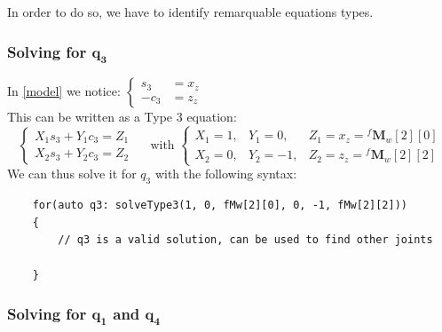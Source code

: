 \documentclass{ecnreport}
\begin{document}
In order to do so, we have to identify remarquable equations types. 

\subsubsection*{Solving for $\mathbf{q_3}$}

In \eqref{model} we notice: $\left\{\begin{array}{ll}s_3 &= x_z \\ -c_3 &= z_z\end{array}\right.$  \\
This can be written as a Type 3 equation:
\begin{equation*}
\left\{\begin{array}{l}X_1s_3+Y_1c_3 = Z_1 \\ X_2s_3+Y_2c_3 = Z_2\end{array}\right. \quad \text{ with } 
\left\{\begin{array}{ccc}
        X_1 = 1, & Y_1 = 0, & Z_1 = x_z = {}^f\mathbf{M}_w[2][0]\\X_2 = 0, & Y_2 = -1, & Z_2 = z_z = {}^f\mathbf{M}_w[2][2]
        \end{array}\right.
        \label{eq:q3}
\end{equation*} 
We can thus solve it for $q_3$ with the following syntax:
\begin{center}
    \cppstyle \raggedright
    \begin{lstlisting}
    for(auto q3: solveType3(1, 0, fMw[2][0], 0, -1, fMw[2][2]))
    {
        // q3 is a valid solution, can be used to find other joints        
    
    }
    \end{lstlisting}
\end{center}

    \subsubsection*{Solving for $\mathbf{q_1}$ and $\mathbf{q_4}$}
    
\end{document}
